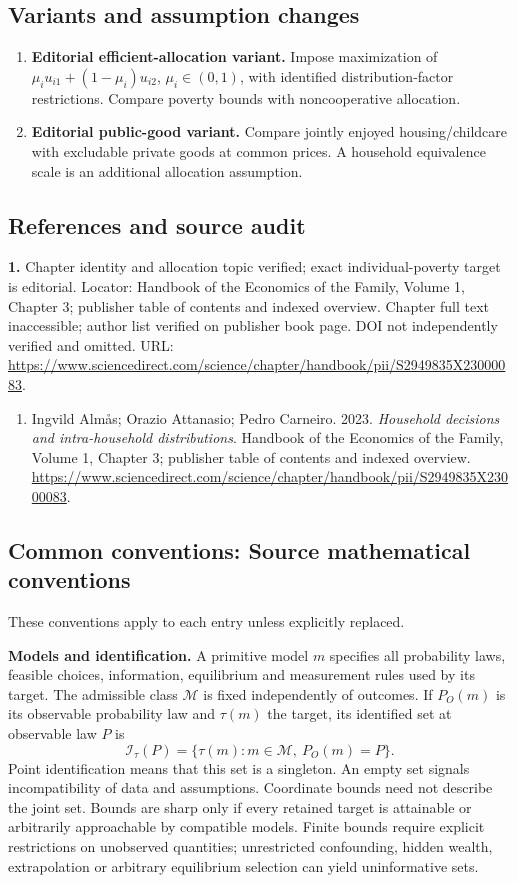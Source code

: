 \documentclass[11pt,a4paper]{article}
\begin{document}
\subsection*{Variants and assumption changes}
\begin{enumerate}
\item \textbf{Editorial efficient-allocation variant.} Impose maximization of \(\mu_i u_{i1}+(1-\mu_i)u_{i2}\), \(\mu_i\in(0,1)\), with identified distribution-factor restrictions. Compare poverty bounds with noncooperative allocation.
\item \textbf{Editorial public-good variant.} Compare jointly enjoyed housing/childcare with excludable private goods at common prices. A household equivalence scale is an additional allocation assumption.
\end{enumerate}
\subsection*{References and source audit}
\textbf{1.} Chapter identity and allocation topic verified; exact individual-poverty target is editorial. Locator: Handbook of the Economics of the Family, Volume 1, Chapter 3; publisher table of contents and indexed overview. Chapter full text inaccessible; author list verified on publisher book page. DOI not independently verified and omitted. URL: \url{https://www.sciencedirect.com/science/chapter/handbook/pii/S2949835X23000083}.
\begin{enumerate}\raggedright
\item\hypertarget{definitions:source:30007740:1}{} Ingvild Almås; Orazio Attanasio; Pedro Carneiro. 2023. \emph{Household decisions and intra-household distributions}. Handbook of the Economics of the Family, Volume 1, Chapter 3; publisher table of contents and indexed overview.
\url{https://www.sciencedirect.com/science/chapter/handbook/pii/S2949835X23000083}.
\end{enumerate}

\subsection*{Common conventions: Source mathematical conventions}

These conventions apply to each entry unless explicitly replaced.

\textbf{Models and identification.} A primitive model \(m\) specifies all probability laws, feasible choices, information, equilibrium and measurement rules used by its target. The admissible class \(\mathcal M\) is fixed independently of outcomes. If \(P_O(m)\) is its observable probability law and \(\tau(m)\) the target, its identified set at observable law \(P\) is
\[
 \mathcal I_\tau(P)=\{\tau(m):m\in\mathcal M,\ P_O(m)=P\}.
\]
Point identification means that this set is a singleton. An empty set signals incompatibility of data and assumptions. Coordinate bounds need not describe the joint set. Bounds are sharp only if every retained target is attainable or arbitrarily approachable by compatible models. Finite bounds require explicit restrictions on unobserved quantities; unrestricted confounding, hidden wealth, extrapolation or arbitrary equilibrium selection can yield uninformative sets.
\end{document}
